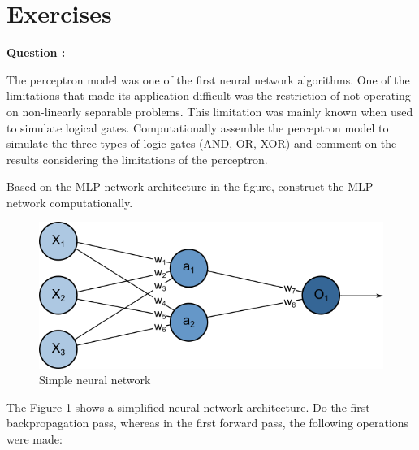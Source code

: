 \newpage
\section{Exercises}
\begin{list}{
\textbf{Question :}~}{}

\iffalse
\item \noindent The perceptron model was one of the first neural network algorithms. One of the limitations that made its application difficult was the restriction of not operating on non-linearly separable problems. This limitation was mainly known when used to simulate logical gates. Computationally assemble the perceptron model to simulate the three types of logic gates (AND, OR, XOR) and comment on the results considering the limitations of the perceptron.


\item \noindent  Based on the MLP network architecture in the figure, construct the MLP network computationally.
\begin{figure}
    \centering
    \includegraphics[scale=0.65]{images/backpropagation_ex.png}
    \caption{Simple neural network}
    \label{fig:exercise7}
\end{figure}

\item \noindent The Figure \ref{fig:exercise7} shows a simplified neural network architecture. Do the first backpropagation pass, whereas in the first forward pass, the following operations were made:


\end{list}
